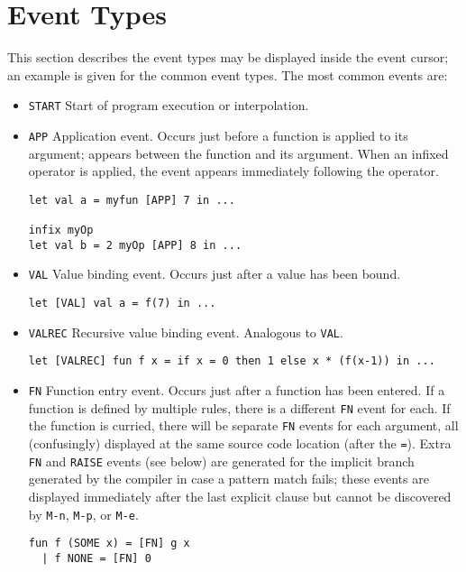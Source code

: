 \section{Event Types}
\label{sec:events}
This section describes the event types may be displayed 
inside the event cursor; an example is given for the common event types.
The most common events are:
\begin{itemize}

\item{\verb'START'}
Start of program execution or interpolation.

\item{\verb'APP'} 
Application event.  
Occurs just before a function is applied to
its argument; appears between the function and its argument.  When an
infixed operator is applied, the event appears immediately following
the operator.
\begin{verbatim}
let val a = myfun [APP] 7 in ...

infix myOp
let val b = 2 myOp [APP] 8 in ...
\end{verbatim}

\item{\verb'VAL'}
Value binding event.  Occurs just after a value has been bound.
\begin{verbatim}
let [VAL] val a = f(7) in ...
\end{verbatim}

\item{\verb'VALREC'} 
Recursive value binding event.  Analogous to \verb'VAL'.
\begin{verbatim}
let [VALREC] fun f x = if x = 0 then 1 else x * (f(x-1)) in ...
\end{verbatim}

\item{\verb'FN'}
Function entry event.  Occurs just after a function has been
entered.  If a function is defined by multiple rules, there is a different
\verb'FN' event for each.
If the function is curried, there will be separate \verb'FN' events for each 
argument, all (confusingly) displayed at the same source code location
(after the \verb'=').
Extra \verb'FN' and \verb'RAISE' events (see below) are
generated for the implicit branch generated
by the compiler in case a pattern match fails; these events are displayed
immediately after the last explicit clause but cannot be discovered
by \verb'M-n', \verb'M-p', or \verb'M-e'.
\begin{verbatim}
fun f (SOME x) = [FN] g x
  | f NONE = [FN] 0
\end{verbatim}


\end{itemize}
